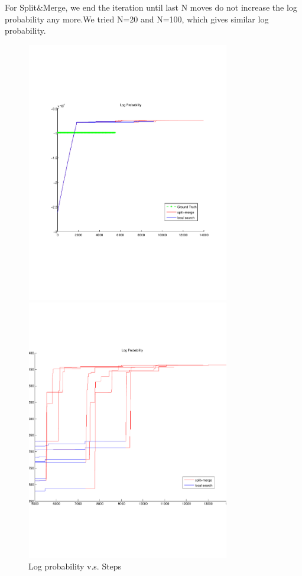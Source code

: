 \documentclass{article}
\begin{document}
\begin{spacing}{1.1}
\begin{enumerate}[(I)]
For Split$\&$Merge, we end the iteration until last N moves do not increase the log probability any more.We tried N=20 and N=100, which gives similar log probability.
\begin{figure}[h]
  \begin{minipage}[b]{0.5\textwidth} 
    \centering 
        \includegraphics[width=3.5in,height=4.5in]{log_prob.pdf} 
    \caption{Log probability v.s. Steps} 
    \label{fig:by:table} 
  \end{minipage}%
  \begin{minipage}[b]{0.5\textwidth} 
    \centering 
    \includegraphics[width=3.5in,height=4.5in]{log_prob_2.pdf} 

\end{minipage}
\end{figure}
\end{enumerate}
\end{spacing}
\end{document}

